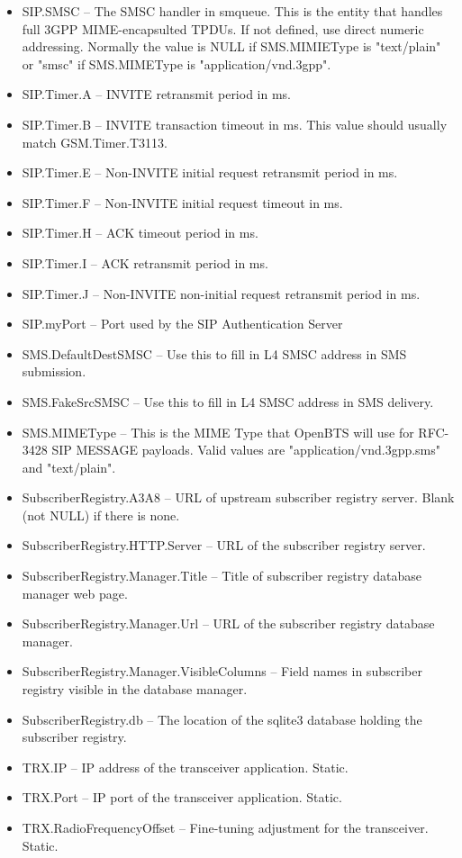 \documentclass[11pt,openany]{book}
\begin{document}
\begin{itemize}
\item SIP.SMSC -- The SMSC handler in smqueue.  This is the entity that handles full 3GPP MIME-encapsulted TPDUs.  If not defined, use direct numeric addressing.  Normally the value is NULL if SMS.MIMIEType is "text/plain" or "smsc" if SMS.MIMEType is "application/vnd.3gpp".
\item SIP.Timer.A -- INVITE retransmit period in ms.
\item SIP.Timer.B -- INVITE transaction timeout in ms.  This value should usually match GSM.Timer.T3113.
\item SIP.Timer.E -- Non-INVITE initial request retransmit period in ms.
\item SIP.Timer.F -- Non-INVITE initial request timeout in ms.
\item SIP.Timer.H -- ACK timeout period in ms.
\item SIP.Timer.I -- ACK retransmit period in ms.
\item SIP.Timer.J -- Non-INVITE non-initial request retransmit period in ms.
\item SIP.myPort -- Port used by the SIP Authentication Server
\item SMS.DefaultDestSMSC -- Use this to fill in L4 SMSC address in SMS submission.
\item SMS.FakeSrcSMSC -- Use this to fill in L4 SMSC address in SMS delivery.
\item SMS.MIMEType -- This is the MIME Type that OpenBTS will use for RFC-3428 SIP MESSAGE payloads.  Valid values are "application/vnd.3gpp.sms" and "text/plain".
\item SubscriberRegistry.A3A8 -- URL of upstream subscriber registry server.  Blank (not NULL) if there is none.
\item SubscriberRegistry.HTTP.Server -- URL of the subscriber registry server.
\item SubscriberRegistry.Manager.Title -- Title of subscriber registry database manager web page.
\item SubscriberRegistry.Manager.Url -- URL of the subscriber registry database manager.
\item SubscriberRegistry.Manager.VisibleColumns -- Field names in subscriber registry visible in the database manager.
\item SubscriberRegistry.db -- The location of the sqlite3 database holding the subscriber registry.
\item TRX.IP -- IP address of the transceiver application.  Static.
\item TRX.Port -- IP port of the transceiver application.  Static.
\item TRX.RadioFrequencyOffset -- Fine-tuning adjustment for the transceiver.  Static.
\end{itemize}
\end{document}
